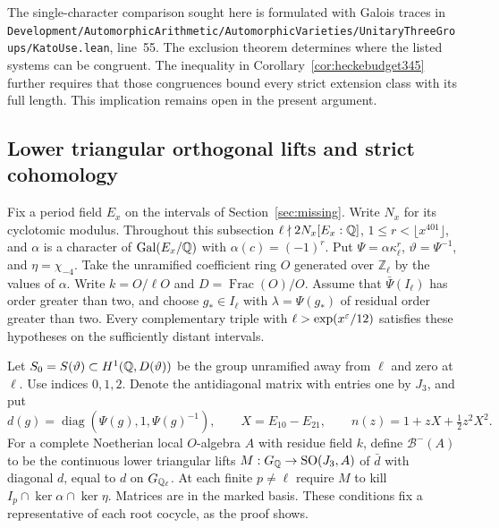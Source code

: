 \documentclass[a4paper,11pt]{article}
\theoremstyle{definition}
\theoremstyle{remark}
\newcommand{\ZZ}{\mathbb Z}\newcommand{\ord}{\operatorname{ord}}
\newcommand{\srcloc}[2]{{\small\nolinkurl{#1.lean}}, line~#2}
\numberwithin{equation}{section}
\begin{document}
The single-character comparison sought here is formulated with
Galois traces in
\srcloc{Development/AutomorphicArithmetic/AutomorphicVarieties/UnitaryThreeGroups/KatoUse}{55}.
The exclusion theorem determines where the listed systems can be
congruent. The inequality in Corollary~\ref{cor:heckebudget345}
further requires that those congruences bound every strict
extension class with its full length. This implication remains
open in the present argument.


\subsection{Lower triangular orthogonal lifts and strict cohomology}\label{sec:evenroot358}

Fix a period field \(E_x\) on the intervals of Section~\ref{sec:missing}.
Write \(N_x\) for its cyclotomic modulus. Throughout this subsection
\(\ell\nmid 2N_x[E_x:\mathbb Q]\), \(1\le r<\lfloor x^{401}\rfloor\), and
\(\alpha\) is a character of \(\operatorname{Gal}(E_x/\mathbb Q)\) with
\(\alpha(c)=(-1)^r\). Put \(\Psi=\alpha\kappa_\ell^r\),
\(\vartheta=\Psi^{-1}\), and \(\eta=\chi_{-4}\). Take the unramified
coefficient ring \(O\) generated over \(\ZZ_\ell\) by the values
of \(\alpha\). Write \(k=O/\ell O\) and \(D=\operatorname{Frac}(O)/O\).
Assume that \(\bar\Psi(I_\ell)\) has order greater than two, and choose
\(g_*\in I_\ell\) with \(\lambda=\Psi(g_*)\) of residual order greater
than two. Every complementary triple with \(\ell>\exp(x^\varepsilon/12)\)
satisfies these hypotheses on the sufficiently distant intervals.

Let \(S_0=S(\vartheta)\subset H^1(\mathbb Q,D(\vartheta))\) be the
group unramified away from \(\ell\) and zero at \(\ell\).
Use indices \(0,1,2\). Denote the antidiagonal matrix with entries
one by \(J_3\), and put
\[
 d(g)=\operatorname{diag}(\Psi(g),1,\Psi(g)^{-1}),\qquad
 X=E_{10}-E_{21},\qquad n(z)=1+zX+\tfrac12 z^2X^2 .
\]
For a complete Noetherian local \(O\)-algebra \(A\) with residue
field \(k\), define \(\mathcal B^-(A)\) to be the continuous lower
triangular lifts \(M:G_\mathbb Q\to\mathrm{SO}(J_3,A)\) of \(\bar d\) with
diagonal \(d\), equal to \(d\) on \(G_{\mathbb Q_\ell}\). At each finite
\(p\ne\ell\) require \(M\) to kill \(I_p\cap\ker\alpha\cap\ker\eta\).
Matrices are in the marked basis. These conditions fix a
representative of each root cocycle, as the proof shows.
\end{document}
